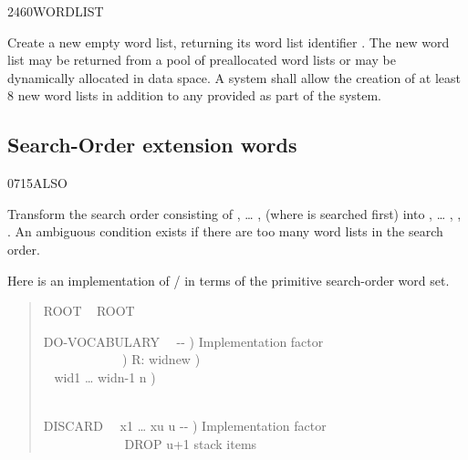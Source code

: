 \begin{worddef}{2460}{WORDLIST}
\item {}

	Create a new empty word list, returning its word list identifier
	. The new word list may be returned from a pool of
	preallocated word lists or may be dynamically allocated in data
	space. A system shall allow the creation of at least 8 new word
	lists in addition to any provided as part of the system.
\end{worddef}


\subsection{Search-Order extension words} %
\extended

\begin{worddef}{0715}{ALSO}
\item \stack{}{}

	Transform the search order consisting of , {\ldots}
	,  (where  is searched
	first) into , {\ldots} , ,
	. An ambiguous condition exists if there are too
	many word lists in the search order.

	\begin{rationale} %
		Here is an implementation of / in terms
		of the primitive search-order word set.
		\begin{quote}\ttfamily
		  ROOT ~
		ROOT 

		\word{:} DO-VOCABULARY~~ -{}- )
			 Implementation factor \\
		\tab{}~~ 
				~~~~~~~~~\word{p} )  R: widnew ) \\
		\tab~  
				 wid1 {\ldots} widn-1 n ) \\
		\tab~   \\
		\word{;}

		\word{:} DISCARD~~ x1 {\ldots} xu u -{}- )
			 Implementation factor \\
		   
			~~~~~~~~~~~~ DROP u+1 stack items \\
		\word{;}


\end{quote}
\end{rationale}
\end{worddef}
